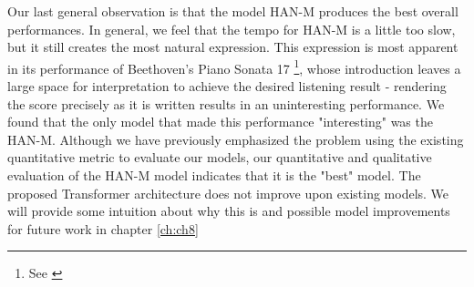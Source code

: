 Our last general observation is that the \vnet{} model HAN-M produces the best overall performances. In general, we feel that the tempo for HAN-M is a little too slow, but it still creates the most natural expression. This expression is most apparent in its performance of Beethoven's Piano Sonata 17%
\footnote{See \href{https://ui.neptune.ai/richt3211/thesis/e/THESIS-162/artifacts}{}}, whose introduction leaves a large space for interpretation to achieve the desired listening result - rendering the score precisely as it is written results in an uninteresting performance. We found that the only model that made this performance "interesting" was the HAN-M. Although we have previously emphasized the problem using the existing quantitative metric to evaluate our models, our quantitative and qualitative evaluation of the HAN-M model indicates that it is the "best" model. The proposed Transformer architecture does not improve upon existing models. We will provide some intuition about why this is and possible model improvements for future work in chapter \ref{ch:ch8}





